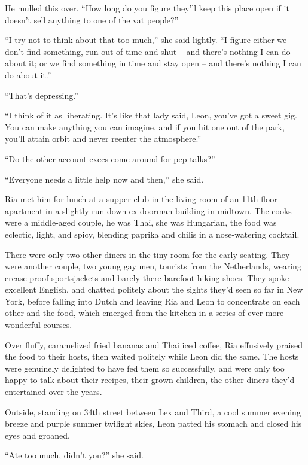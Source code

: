He mulled this over. “How long do you figure they'll keep this place 
open if it doesn't sell anything to one of the vat people?”

“I try not to think about that too much,” she said lightly. “I 
figure either we don't find something, run out of time and shut -- and 
there's nothing I can do about it; or we find something in time and 
stay open -- and there's nothing I can do about it.”

“That's depressing.”

“I think of it as liberating. It's like that lady said, Leon, you've 
got a sweet gig. You can make anything you can imagine, and if you hit 
one out of the park, you'll attain orbit and never reenter the 
atmosphere.”

“Do the other account execs come around for pep talks?”

“Everyone needs a little help now and then,” she said.

\tb

Ria met him for lunch at a supper-club in the living room of an 11th 
floor apartment in a slightly run-down ex-doorman building in midtown. 
The cooks were a middle-aged couple, he was Thai, she was Hungarian, 
the food was eclectic, light, and spicy, blending paprika and chilis in 
a nose-watering cocktail.

There were only two other diners in the tiny room for the early 
seating. They were another couple, two young gay men, tourists from the 
Netherlands, wearing crease-proof sportsjackets and barely-there 
barefoot hiking shoes. They spoke excellent English, and chatted 
politely about the sights they'd seen so far in New York, before 
falling into Dutch and leaving Ria and Leon to concentrate on each 
other and the food, which emerged from the kitchen in a series of 
ever-more-wonderful courses.

Over fluffy, caramelized fried bananas and Thai iced coffee, Ria 
effusively praised the food to their hosts, then waited politely while 
Leon did the same. The hosts were genuinely delighted to have fed them 
so successfully, and were only too happy to talk about their recipes, 
their grown children, the other diners they'd entertained over the 
years.

Outside, standing on 34th street between Lex and Third, a cool summer 
evening breeze and purple summer twilight skies, Leon patted his 
stomach and closed his eyes and groaned.

“Ate too much, didn't you?” she said.

